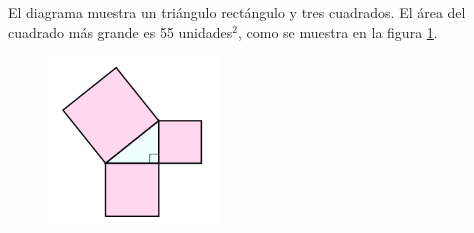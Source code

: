 \question[15]  El diagrama muestra un triángulo rectángulo y tres cuadrados.
El área del cuadrado más grande es 55 unidades$^2$, como se muestra en la figura \ref{fig:area11}.
\begin{figure}[H]
    \begin{center}
        \includegraphics[width=0.4\textwidth]{../images/area11.png}
    \end{center}
    \caption{}
    \label{fig:area11}
\end{figure}

